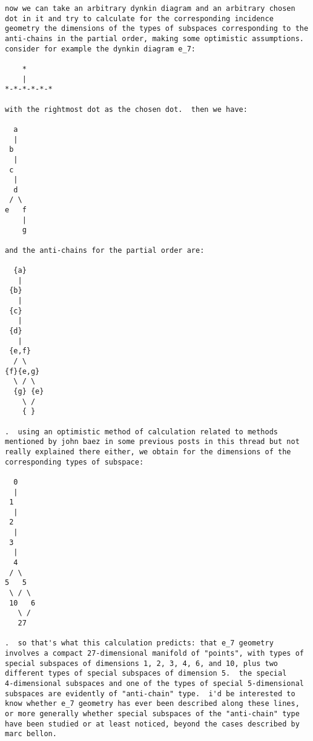 \begin{verbatim}
now we can take an arbitrary dynkin diagram and an arbitrary chosen
dot in it and try to calculate for the corresponding incidence
geometry the dimensions of the types of subspaces corresponding to the
anti-chains in the partial order, making some optimistic assumptions.
consider for example the dynkin diagram e_7:

    *
    |
*-*-*-*-*-*

with the rightmost dot as the chosen dot.  then we have:

  a
  |
 b
  |
 c
  |
  d
 / \
e   f
    |
    g

and the anti-chains for the partial order are:

  {a}
   |
 {b}
   |
 {c}
   |
 {d}
   |
 {e,f}
  / \
{f}{e,g}
  \ / \
  {g} {e}
    \ /
    { }

.  using an optimistic method of calculation related to methods
mentioned by john baez in some previous posts in this thread but not
really explained there either, we obtain for the dimensions of the
corresponding types of subspace:

  0
  |
 1
  |
 2
  |
 3
  |
  4
 / \
5   5
 \ / \
 10   6
   \ /
   27

.  so that's what this calculation predicts: that e_7 geometry
involves a compact 27-dimensional manifold of "points", with types of
special subspaces of dimensions 1, 2, 3, 4, 6, and 10, plus two
different types of special subspaces of dimension 5.  the special
4-dimensional subspaces and one of the types of special 5-dimensional
subspaces are evidently of "anti-chain" type.  i'd be interested to
know whether e_7 geometry has ever been described along these lines,
or more generally whether special subspaces of the "anti-chain" type
have been studied or at least noticed, beyond the cases described by
marc bellon.

\end{verbatim}
    
